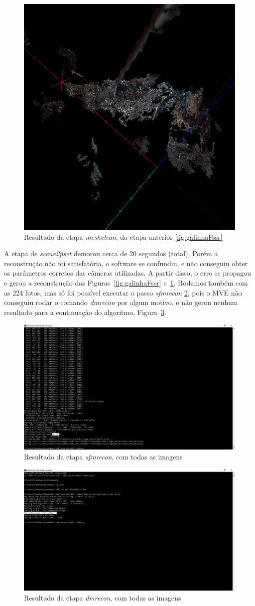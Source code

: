 \begin{figure}[!h]
	\centering
	\includegraphics[width=0.7\linewidth]{figs/galinhameshclean.png}
	\caption{%
	Resultado da etapa \emph{meshclean}, da etapa anterior \ref{fig:galinhaFssr}
	}\label{fig:galinhaMeshClean}
\end{figure}

A etapa de \emph{scene2pset} demorou cerca de 20 segundos (total). Porém
a reconstrução não foi satisfatória, o software se confundiu, e
não conseguiu obter os parâmetros corretos das câmeras utilizadas. A partir
disso, o erro se propagou e gerou a reconstrução das Figuras~\ref{fig:galinhaFssr}
e~\ref{fig:galinhaMeshClean}.  Rodamos também com as 224 fotos, mas só foi possível
executar o passo \emph{sfmrecon} \ref{fig:galinhaSfM224}, pois o MVE não
conseguiu rodar o comando \emph{dmrecon} por algum motivo, e não gerou nenhum
resultado para a continuação do algoritmo, Figura~\ref{fig:galinhaDMR224}.

\begin{figure}[!h]
	\centering
	\includegraphics[width=0.5\linewidth]{figs/mvesfmrecongalinhapertolonge.png}
	\caption{%
	Resultado da etapa \emph{sfmrecon}, com todas as imagens
	}\label{fig:galinhaSfM224}
\end{figure}

\begin{figure}[!h]
	\centering
	\includegraphics[width=0.5\linewidth]{figs/mvedmrecongalinhapertolonge.png}
	\caption{%
	Resultado da etapa \emph{dmrecon}, com todas as imagens
	}\label{fig:galinhaDMR224}
\end{figure}

